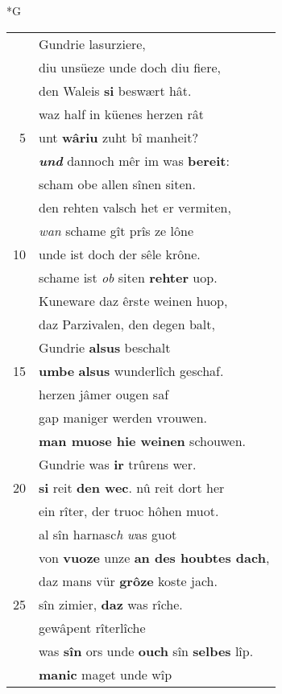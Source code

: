 \documentclass[8pt,a4paper,notitlepage]{article}
\begin{document}
\newpage
\begin{table}[ht]
\begin{minipage}[t]{0.5\linewidth}
\small
\begin{center}*G
\end{center}
\begin{tabular}{rl}
 & Gundrie lasurziere,\\ 
 & diu unsüeze unde doch diu fiere,\\ 
 & den Waleis \textbf{si} beswært hât.\\ 
 & waz half in küenes herzen rât\\ 
5 & unt \textbf{wâriu} zuht bî manheit?\\ 
 & \textit{\textbf{und}} dannoch mêr im was \textbf{bereit}:\\ 
 & scham obe allen sînen siten.\\ 
 & den rehten valsch het er vermiten,\\ 
 & \textit{wan} schame gît prîs ze lône\\ 
10 & unde ist doch der sêle krône.\\ 
 & schame ist \textit{ob} siten \textbf{rehter} uop.\\ 
 & Kuneware daz êrste weinen huop,\\ 
 & daz Parzivalen, den degen balt,\\ 
 & Gundrie \textbf{alsus} beschalt\\ 
15 & \textbf{umbe} \textbf{alsus} wunderlîch geschaf.\\ 
 & herzen jâmer ougen saf\\ 
 & gap maniger werden vrouwen.\\ 
 & \textbf{man muose hie weinen} schouwen.\\ 
 & Gundrie was \textbf{ir} trûrens wer.\\ 
20 & \textbf{si} reit \textbf{den wec}. nû reit dort her\\ 
 & ein rîter, der truoc hôhen muot.\\ 
 & al sîn harnasc\textit{h} \textit{w}as guot\\ 
 & von \textbf{vuoze} unze \textbf{an des houbtes dach},\\ 
 & daz mans vür \textbf{grôze} koste jach.\\ 
25 & sîn zimier, \textbf{daz} was rîche.\\ 
 & gewâpent rîterlîche\\ 
 & was \textbf{sîn} ors unde \textbf{ouch} sîn \textbf{selbes} lîp.\\ 
 & \textbf{manic} maget unde wîp\\ 

\end{tabular}
\end{minipage}
\end{table}
\end{document}
